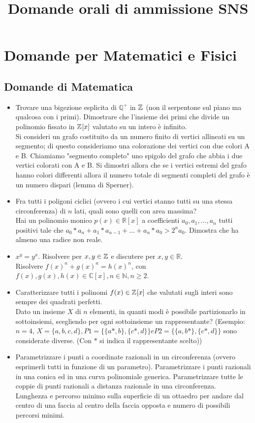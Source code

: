 \documentclass[a4paper,11pt]{article}
\title{Domande orali di ammissione SNS}
\author{}
\newcommand{\QQ}{\mathbb{Q}}
\newcommand{\NN}{\mathbb{N}}
\newcommand{\RR}{\mathbb{R}}
\newcommand{\CC}{\mathbb{C}}
\begin{document}
\maketitle
\section*{Domande per Matematici e Fisici}
\subsection*{Domande di Matematica}
\begin{itemize}
\item Trovare una bigezione esplicita di $\QQ^{+}$ in $\ZZ$ (non il serpentone sul piano ma qualcosa con i primi). Dimostrare che l'insieme dei primi che divide un polinomio fissato in $\ZZ [x]$ valutato su un intero \`e infinito. \\ Si consideri un grafo costituito da un numero finito di vertici allineati su un segmento; di questo consideriamo una colorazione dei vertici con due colori A e B. Chiamiamo "segmento completo" uno spigolo del grafo che abbia i due vertici colorati con A e B. Si dimostri allora che se i vertici estremi del grafo hanno colori differenti allora il numero totale di segmenti completi del grafo \`e un numero dispari (lemma di Sperner).
\item Fra tutti i poligoni ciclici (ovvero i cui vertici stanno tutti su una stessa circonferenza) di $n$ lati, quali sono quelli con area massima? \\ Hai un polinomio monico $p(x) \in \RR[x]$ a coefficienti $a_0, a_1, \ldots, a_n$ tutti positivi tale che $a_0*a_n + a_1*a_{n-1} + \ldots + a_n * a_0 > 2^n a_0$. Dimostra che ha almeno una radice non reale.
\item $x^y = y^x$. Risolvere per $x,y \in \ZZ$ e discutere per $x,y \in \RR$. \\ Risolvere $f(x)^n + g(x)^n = h(x)^n$, con $f(x),g(x),h(x) \in \CC [x], n \in \NN, n \ge 2$.
\item Caratterizzare tutti i polinomi $f(x) \in \ZZ [x]$ che valutati sugli interi sono sempre dei quadrati perfetti. \\ Dato un insieme $X$ di $n$ elementi, in quanti modi \`e possibile partizionarlo in sottoinsiemi, scegliendo per ogni sottoinsieme un rappresentante? (Esempio: $n=4$, $X = \{a,b,c,d\}, P1 = \{\{a*,b\},\{c*,d\}\} e P2 = \{\{a,b*\},\{c*,d\}\}$ sono considerate diverse. (Con $*$ si indica il rappresentante scelto))
\item Parametrizzare i punti a coordinate razionali in un circonferenza (ovvero esprimerli tutti in funzione di un parametro). Parametrizzare i punti razionali in una conica ed in una curva polinomiale generica. Parametrizzare tutte le coppie di punti razionali a distanza razionale in una circonferenza. \\ Lunghezza e percorso minimo sulla superficie di un ottaedro per andare dal centro di una faccia al centro della faccia opposta e numero di possibili percorsi minimi.

\end{itemize}
\end{document}
